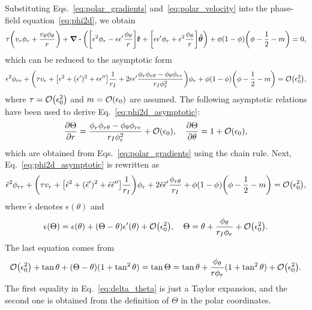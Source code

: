 \documentclass{article}
\begin{document}
Substituting Eqs.~\eqref{eq:polar_gradients} and~\eqref{eq:polar_velocity}
into the phase-field equation~\eqref{eq:phi2d}, we obtain
\begin{equation}\label{eq:phi2d_polar}
    \tau\qty( v_r\phi_r + \frac{v_\theta\phi_\theta}{r} ) + \div(
        \qty[ \epsilon^2\phi_r - \epsilon\epsilon'\frac{\phi_\theta}{r} ]\vu{r}
        + \qty[ \epsilon\epsilon'\phi_r + \epsilon^2\frac{\phi_\theta}{r} ]\vu*\theta
    ) + \phi(1-\phi)\qty(\phi - \frac12 - m) = 0,
\end{equation}
which can be reduced to the asymptotic form
\begin{equation}\label{eq:phi2d_asymptotic}
    \epsilon^2\phi_{rr} + \qty(
        \tau v_r + \qty[\epsilon^2 +  (\epsilon')^2 + \epsilon\epsilon'']\frac1{r_I}
        + 2\epsilon\epsilon'\frac{\phi_r\phi_{r\theta} - \phi_\theta\phi_{rr}}{r_I\phi_r^2}
    )\phi_r + \phi(1-\phi)\qty(\phi - \frac12 - m) = \order{\epsilon_0^2},
\end{equation}
where $\tau=\order{\epsilon_0^2}$ and $m=\order{\epsilon_0}$ are assumed.
The following asymptotic relations have been used to derive Eq.~\eqref{eq:phi2d_asymptotic}:
\begin{equation}\label{eq:theta_asymptotic}
    \pdv{\Theta}{r} = \frac{\phi_r\phi_{r\theta} - \phi_\theta\phi_{rr}}{r_I\phi_r^2} + \order{\epsilon_0}, \quad
    \pdv{\Theta}{\theta} = 1 + \order{\epsilon_0},
\end{equation}
which are obtained from Eqs.~\eqref{eq:polar_gradients} using the chain rule.
Next, Eq.~\eqref{eq:phi2d_asymptotic} is rewritten as
\begin{equation}\label{eq:phi2d_epsilon_I}
    \tilde\epsilon^2\phi_{rr} + \qty(
        \tau v_r + \qty[\tilde\epsilon^2 + (\tilde\epsilon')^2 + \tilde\epsilon\tilde\epsilon'']\frac1{r_I}
    )\phi_r + 2\tilde\epsilon\tilde\epsilon'\frac{\phi_{r\theta}}{r_I}
    + \phi(1-\phi)\qty(\phi - \frac12 - m) = \order{\epsilon_0^2},
\end{equation}
where $\tilde\epsilon$ denotes $\epsilon(\theta)$ and
\begin{equation}\label{eq:epsilon_asymptotic}
    \epsilon(\Theta) = \epsilon(\theta) + (\Theta - \theta)\epsilon'(\theta) + \order{\epsilon_0^2}, \quad
    \Theta = \theta + \frac{\phi_\theta}{r_I\phi_r} + \order{\epsilon_0^2}.
\end{equation}
The last equation comes from
\begin{equation}\label{eq:delta_theta}
    \order{\epsilon_0^2} + \tan\theta + (\Theta - \theta)(1+\tan^2\theta) = \tan\Theta
        = \tan\theta + \frac{\phi_\theta}{r\phi_r}(1+\tan^2\theta) + \order{\epsilon_0^2}.
\end{equation}
The first equality in Eq.~\eqref{eq:delta_theta} is just a Taylor expansion,
and the second one is obtained from the definition of $\Theta$ in the polar coordinates.
\end{document}
